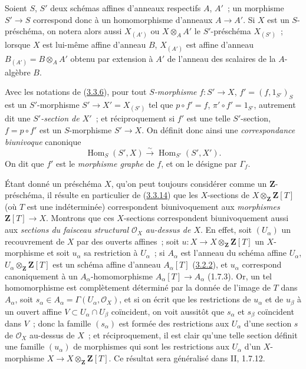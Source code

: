 \begin{env}[3.3.13]
\label{I.3.3.13-fr}
Soient $S$, $S'$ deux schémas affines d'anneaux respectifs $A$, $A'$~; un
morphisme $S'\to S$ correspond donc à un homomorphisme d'anneaux $A\to A'$.
Si $X$ est un $S$-préschéma, on notera alors aussi $X_{(A')}$ ou
$X\otimes_A A'$ le $S'$-préschéma $X_{(S')}$~; lorsque $X$ est lui-même
affine d'anneau $B$, $X_{(A')}$ est affine d'anneau
$B_{(A')}=B\otimes_A A'$ obtenu par extension à $A'$ de l'anneau des scalaires
de la $A$-algèbre $B$.
\end{env}

\begin{env}[3.3.14]
\label{I.3.3.14-fr}
Avec les notations de (\hyperref[I.3.3.6-fr]{3.3.6}), pour tout
\emph{$S$-morphisme} $f:S'\to X$, $f'=(f,1_{S'})_S$ est un $S'$-morphisme
$S'\to X'=X_{(S')}$ tel que $p\circ f'=f$, $\pi'\circ f'=1_{S'}$, autrement
dit une \emph{$S'$-section de $X'$}~; et réciproquement si $f'$ est une telle
$S'$-section, $f=p\circ f'$ est un $S$-morphisme $S'\to X$. On définit donc
ainsi une \emph{correspondance biunivoque} canonique
\label{I.3.3.14.correspondence-fr}
\[
  \operatorname{Hom}_S(S',X)\overset{\sim}{\longrightarrow}
  \operatorname{Hom}_{S'}(S',X').
\]
On dit que $f'$ est le \emph{morphisme graphe} de $f$, et on le désigne par
$\Gamma_f$.
\end{env}

\begin{env}[3.3.15]
\label{I.3.3.15-fr}
Étant donné un préschéma $X$, qu'on peut toujours considérer comme un
$\mathbf{Z}$-préschéma, il résulte en particulier de
(\hyperref[I.3.3.14-fr]{3.3.14}) que les $X$-sections de
$X\otimes_{\mathbf{Z}}\mathbf{Z}[T]$ (où $T$ est une indéterminée)
correspondent biunivoquement aux \emph{morphismes}
$\mathbf{Z}[T]\to X$. Montrons que ces $X$-sections correspondent
biunivoquement aussi aux \emph{sections du faisceau structural
$\mathcal{O}_X$ au-dessus de $X$}. En effet, soit $(U_\alpha)$ un recouvrement
de $X$ par des ouverts affines~; soit
$u:X\to X\otimes_{\mathbf{Z}}\mathbf{Z}[T]$ un $X$-morphisme et soit
$u_\alpha$ sa restriction à $U_\alpha$~; si $A_\alpha$ est l'anneau du schéma
affine $U_\alpha$, $U_\alpha\otimes_{\mathbf{Z}}\mathbf{Z}[T]$ est un schéma
affine d'anneau $A_\alpha[T]$ (\hyperref[I.3.2.2-fr]{3.2.2}), et $u_\alpha$
correspond canoniquement à un $A_\alpha$-homomorphisme
$A_\alpha[T]\to A_\alpha$ (1.7.3). Or, un tel homomorphisme est complètement
déterminé par la donnée de l'image de $T$ dans $A_\alpha$, soit
$s_\alpha\in A_\alpha=\Gamma(U_\alpha,\mathcal{O}_X)$, et si on écrit que les
restrictions de $u_\alpha$ et de $u_\beta$ à un ouvert affine
$V\subset U_\alpha\cap U_\beta$ coïncident, on voit aussitôt que $s_\alpha$
et $s_\beta$ coïncident dans $V$~; donc la famille $(s_\alpha)$ est formée des
restrictions aux $U_\alpha$ d'une section $s$ de $\mathcal{O}_X$ au-dessus de
$X$~; et réciproquement, il est clair qu'une telle section définit une famille
$(u_\alpha)$ de morphismes qui sont les restrictions aux $U_\alpha$ d'un
$X$-morphisme $X\to X\otimes_{\mathbf{Z}}\mathbf{Z}[T]$. Ce résultat sera
généralisé dans II, 1.7.12.
\end{env}

